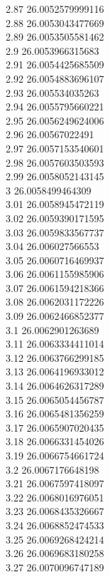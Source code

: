 {2.87	26.0052579999116\\
2.88	26.0053043477669\\
2.89	26.0053505581462\\
2.9	26.0053966315683\\
2.91	26.0054425685509\\
2.92	26.0054883696107\\
2.93	26.005534035263\\
2.94	26.0055795660221\\
2.95	26.0056249624006\\
2.96	26.00567022491\\
2.97	26.0057153540601\\
2.98	26.0057603503593\\
2.99	26.0058052143145\\
3	26.0058499464309\\
3.01	26.0058945472119\\
3.02	26.0059390171595\\
3.03	26.0059833567737\\
3.04	26.006027566553\\
3.05	26.0060716469937\\
3.06	26.0061155985906\\
3.07	26.0061594218366\\
3.08	26.0062031172226\\
3.09	26.0062466852377\\
3.1	26.0062901263689\\
3.11	26.0063334411014\\
3.12	26.0063766299185\\
3.13	26.0064196933012\\
3.14	26.0064626317289\\
3.15	26.0065054456787\\
3.16	26.0065481356259\\
3.17	26.0065907020435\\
3.18	26.0066331454026\\
3.19	26.0066754661724\\
3.2	26.0067176648198\\
3.21	26.0067597418097\\
3.22	26.0068016976051\\
3.23	26.0068435326667\\
3.24	26.0068852474533\\
3.25	26.0069268424214\\
3.26	26.0069683180258\\
3.27	26.0070096747189\\
}
